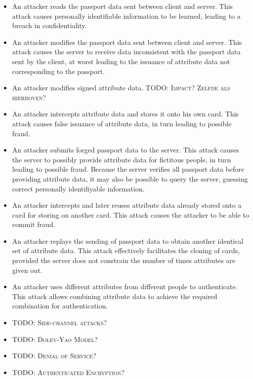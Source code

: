 \begin{itemize}
	\item An attacker reads the passport data sent between client and server. This attack causes personally identifiable information to be learned, leading to a breach in confidentiality. 
  \item An attacker modifies the passport data sent between client and server. This attack causes the server to receive data inconsistent with the passport data sent by the client, at worst leading to the issuance of attribute data not corresponding to the passport.
  \item An attacker modifies signed attribute data. \textsc{TODO: Impact? Zelfde als hierboven?}
  \item An attacker intercepts attribute data and stores it onto his own card. This attack causes false issuance of attribute data, in turn leading to possible fraud.
  \item An attacker submits forged passport data to the server. This attack causes the server to possibly provide attribute data for fictitous people, in turn leading to possible fraud. Because the server verifies all passport data before providing attribute data, it may also be possible to query the server, guessing correct personally identifiyable information.
  \item An attacker intercepts and later reuses attribute data already stored onto a card for storing on another card. This attack causes the attacker to be able to commit fraud.
  \item An attacker replays the sending of passport data to obtain another identical set of attribute data. This attack effectively facilitates the cloning of cards, provided the server does not constrain the number of times attributes are given out.
  \item An attacker uses different attributes from different people to authenticate. This attack allows combining attribute data to achieve the required combination for authentication. 
  \item \textsc{TODO: Side-channel attacks?}
  \item \textsc{TODO: Dolev-Yao Model?}
  \item \textsc{TODO: Denial of Service?}
  \item \textsc{TODO: Authenticated Encryption?}
\end{itemize}


